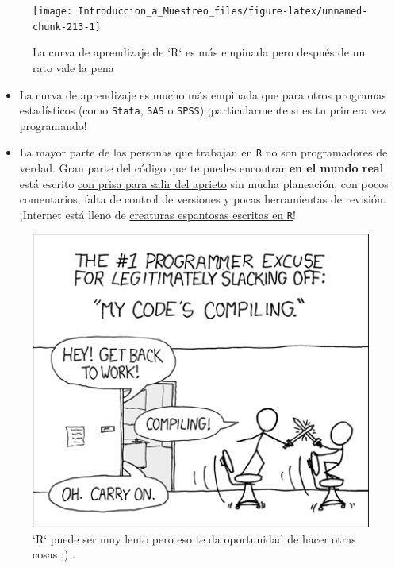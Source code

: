 \documentclass[
]{book}
\begin{document}
\begin{figure}

{\centering \texttt{[image: Introduccion\_a\_Muestreo\_files/figure-latex/unnamed-chunk-213-1]} 

}

\caption{La curva de aprendizaje de `R` es más empinada pero después de un rato vale la pena}\label{fig:unnamed-chunk-213}
\end{figure}

\begin{itemize}
\item
  La curva de aprendizaje es mucho más empinada que para otros programas estadísticos (como \texttt{Stata}, \texttt{SAS} o \texttt{SPSS}) ¡particularmente si es tu primera vez programando!
\item
  La mayor parte de las personas que trabajan en \texttt{R} no son programadores de verdad. Gran parte del código que te puedes encontrar \textbf{en el mundo real} está escrito \href{https://nsaunders.wordpress.com/2014/05/14/this-is-why-code-written-by-scientists-gets-ugly/}{con prisa para salir del aprieto} sin mucha planeación, con pocos comentarios, falta de control de versiones y pocas herramientas de revisión. ¡Internet está lleno de \href{https://codegolf.stackexchange.com/a/4011}{creaturas espantosas escritas en \texttt{R}}!
\end{itemize}

\begin{figure}

{\centering \includegraphics[width=5.74in]{images/compiling} 

}

\caption{`R` puede ser muy lento pero eso te da oportunidad de hacer otras cosas ;) .}\label{fig:unnamed-chunk-214}
\end{figure}
\end{document}
